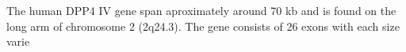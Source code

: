 The human DPP4 IV gene span aproximately around 70 kb and is found on the long arm of chromosome 2 (2q24.3). The gene consists of 26 exons with each size varie